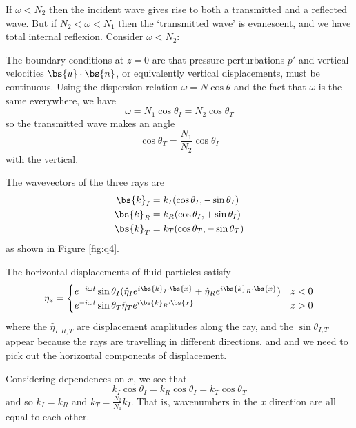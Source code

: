 \documentclass{article}
\begin{document}
If $\omega < N_2$ then the incident wave gives rise to both a transmitted and a
reflected wave. But if $N_2 < \omega < N_1$ then the `transmitted wave' is
evanescent, and we have total internal reflexion. Consider $\omega < N_2$:

The boundary conditions at $z=0$ are that pressure perturbations $p'$ and
vertical velocities $\bs{u}\cdot\bs{n}$, or equivalently vertical displacements,
must be continuous. Using the dispersion relation $\omega = N\cos\theta$ and the
fact that $\omega$ is the same everywhere, we have
\begin{equation}
    \omega = N_1\cos\theta_I = N_2\cos\theta_T
\end{equation}
so the transmitted wave makes an angle 
\begin{equation}
    \cos\theta_T = \frac{N_1}{N_2}\cos\theta_I
\end{equation}
with the vertical.

The wavevectors of the three rays are
\begin{align}
    \bs{k}_I &= k_I (\cos\theta_I,-\sin\theta_I) \\
    \bs{k}_R &= k_R (\cos\theta_I,+\sin\theta_I) \\
    \bs{k}_T &= k_T (\cos\theta_T,-\sin\theta_T) 
\end{align}
as shown in Figure \ref{fig:q4}.

The horizontal displacements of fluid particles satisfy
\begin{equation}
    \eta_x = \begin{cases}
        e^{-i\omega t} \sin\theta_I (\hat\eta_I e^{i\bs{k}_I\cdot\bs{x}} +
                                     \hat\eta_R e^{i\bs{k}_R\cdot\bs{x}}) & z < 0 \\
        e^{-i\omega t} \sin\theta_T \hat\eta_T e^{i\bs{k}_R\cdot\bs{x}} & z > 0
    \end{cases}
\end{equation}
where the $\hat\eta_{I,R,T}$ are displacement amplitudes along the ray, and the
$\sin\theta_{I,T}$ appear because the rays are travelling in different
directions, and and we need to pick out the horizontal components of
displacement.

Considering dependences on $x$, we see that
\begin{equation}
    k_I\cos\theta_I = k_R\cos\theta_I = k_T\cos\theta_T
\end{equation}
and so $k_I = k_R$ and $k_T = \frac{N_2}{N_1}k_I$. That is, wavenumbers in the
$x$ direction are all equal to each other.
\end{document}
